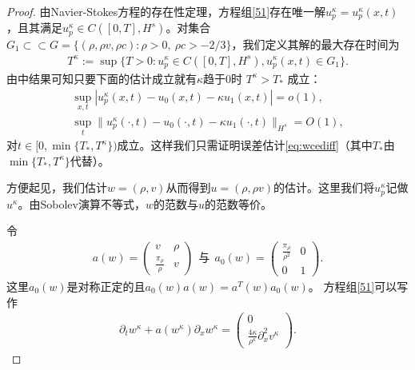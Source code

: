 \begin{proof}
由Navier-Stokes方程的存在性定理\cite{kawashima1984systems}，方程组\eqref{51}存在唯一解$u^\kappa_p=u^\kappa_p(x,t)$，且其满足$u^\kappa_p \in C([0,T],H^s)$。对集合$G_1\subset\subset G= \{(\rho, \rho v, \rho c): \rho>0,\ \rho c > -2/3\}$，我们定义其解的最大存在时间为
\begin{eqnarray*}
  T^\kappa :=\sup \{T>0 : u_p^\kappa  \in C([0,T],H^s), u^\kappa_p(x,t) \in G_1 \}.
\end{eqnarray*}
由\cite{yong2001basic}中结果可知只要下面的估计成立就有$\kappa$趋于$0$时
$T^\kappa > T_*$
成立：
\begin{eqnarray*}
\sup_{x,t} |u_p^\kappa(x,t) - u_0 (x, t) - \kappa u_1(x,t)|=o(1), \\
\sup_t \| u_p^\kappa(\cdot ,t) - u_0 (\cdot, t) - \kappa u_1(\cdot, t) \|_{H^s} = O(1),
\end{eqnarray*}
对$t \in [0,\min\{T_*,T^\kappa\})$成立。这样我们只需证明误差估计\eqref{eq:wcediff}（其中$T_*$由$\min\{T_*,T^\kappa\}$代替）。

方便起见，我们估计$w=(\rho,v)$从而得到$u=(\rho,\rho v)$的估计。这里我们将$u^\kappa_p$记做$u^\kappa$。由Sobolev演算不等式\cite{majda1984compressible}，$w$的范数与$u$的范数等价。

令
\begin{eqnarray*}
  a(w) = \left( \begin{array}{cc} v & \rho \\ \frac{\pi_\rho}{\rho} & v \end{array} \right) \ \ \mbox{与} \ \
  a_0(w) = \left( \begin{array}{cc} \frac{\pi_\rho}{\rho^2} & 0 \\ 0 & 1 \end{array} \right).
\end{eqnarray*}
这里$a_0(w)$是对称正定的且$a_0(w)a(w)=a^T(w)a_0(w)$。
方程组\eqref{51}可以写作
\begin{eqnarray}\label{57}
  \partial_t w^\kappa + a(w^\kappa) \partial_x w^\kappa = \left( \begin{array}{cc} 0 \\ \frac{4 \kappa}{\rho^\kappa} \partial^2_x v^\kappa \end{array} \right) .
\end{eqnarray}


\end{proof}
